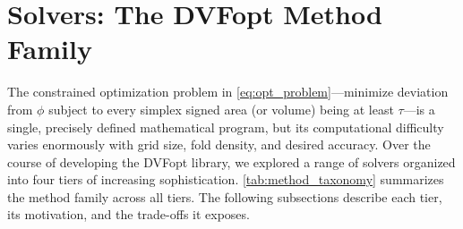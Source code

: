 





\section{Solvers: The DVFopt Method Family}
\label{sec:solvers}

The constrained optimization problem in \autoref{eq:opt_problem}—minimize deviation from $\phi$ subject to every simplex signed area (or volume) being at least $\tau$—is a single, precisely defined mathematical program, but its computational difficulty varies enormously with grid size, fold density, and desired accuracy. Over the course of developing the DVFopt library, we explored a range of solvers organized into four tiers of increasing sophistication. \autoref{tab:method_taxonomy} summarizes the method family across all tiers. The following subsections describe each tier, its motivation, and the trade-offs it exposes.

